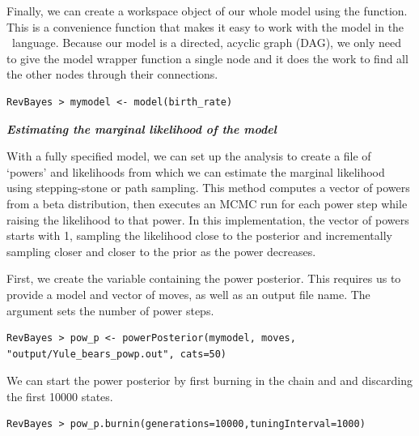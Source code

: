 Finally, we can create a workspace object of our whole model using the  function. 
This is a convenience function that makes it easy to work with the model in the \Rev~language. 
Because our model is a directed, acyclic graph (DAG), we only need to give the model wrapper function a single node and it does the work to find all the other nodes through their connections.
{\tt \begin{snugshade*}
\begin{lstlisting}
RevBayes > mymodel <- model(birth_rate)
\end{lstlisting}
\end{snugshade*}}

\textbf{\textit{Estimating the marginal likelihood of the model}}

With a fully specified model, we can set up the  analysis to create a file of `powers' and likelihoods from which we can estimate the marginal likelihood using stepping-stone or path sampling. 
This method computes a vector of powers from a beta distribution, then executes an MCMC run for each power step while raising the likelihood to that power. In this implementation, the vector of powers starts with 1, sampling the likelihood close to the posterior and incrementally sampling closer and closer to the prior as the power decreases. 


First, we create the variable containing the power posterior. This requires us to provide a model and vector of moves, as well as an output file name. The  argument sets the number of power steps.
{\tt \begin{snugshade*}
\begin{lstlisting}
RevBayes > pow_p <- powerPosterior(mymodel, moves, "output/Yule_bears_powp.out", cats=50) 
\end{lstlisting}
\end{snugshade*}}

We can start the power posterior by first burning in the chain and and discarding the first 10000 states.  
{\tt \begin{snugshade*}
\begin{lstlisting}
RevBayes > pow_p.burnin(generations=10000,tuningInterval=1000)
\end{lstlisting}
\end{snugshade*}}

